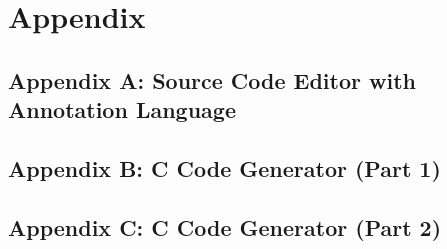 \chapter{Appendix}
\section{Appendix A: Source Code Editor with Annotation Language}
  \label{Source_Code_Editor_in_Xtext}


\section{Appendix B: C Code Generator (Part 1)}	
	\label{C_Code_Generator_Xtend_Code_Snippet_p1}
	
	
\section{Appendix C: C Code Generator (Part 2)}	
\label{C_Code_Generator_Xtend_Code_Snippet_p2}
